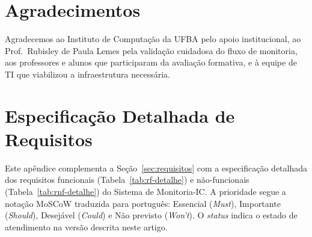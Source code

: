 \documentclass[portuguese]{sbc2025}%
\begin{document}
\FloatBarrier

\section*{Agradecimentos}

Agradecemos ao Instituto de Computação da UFBA pelo apoio institucional, ao Prof.\ Rubisley de Paula Lemes pela validação cuidadosa do fluxo de monitoria, aos professores e alunos que participaram da avaliação formativa, e à equipe de TI que viabilizou a infraestrutura necessária.




\onecolumn
\appendix

\section{Especificação Detalhada de Requisitos}
\label{sec:appendix-requisitos}

Este apêndice complementa a Seção~\ref{sec:requisitos} com a especificação detalhada dos requisitos funcionais (Tabela~\ref{tab:rf-detalhe}) e não-funcionais (Tabela~\ref{tab:rnf-detalhe}) do Sistema de Monitoria-IC. A prioridade segue a notação MoSCoW traduzida para português: Essencial (\textit{Must}), Importante (\textit{Should}), Desejável (\textit{Could}) e Não previsto (\textit{Won't}). O \textit{status} indica o estado de atendimento na versão descrita neste artigo.
\end{document}
